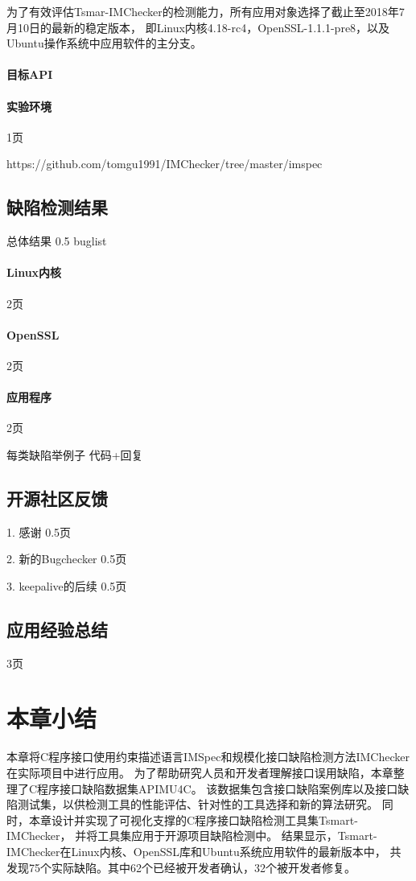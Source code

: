 为了有效评估Tsmar-IMChecker的检测能力，所有应用对象选择了截止至2018年7月10日的最新的稳定版本，
即Linux内核4.18-rc4，OpenSSL-1.1.1-pre8，以及Ubuntu操作系统中应用软件的主分支。

\paragraph{目标API}

\paragraph{实验环境}
1页

https://github.com/tomgu1991/IMChecker/tree/master/imspec


\subsection{缺陷检测结果}



总体结果
0.5
buglist

\paragraph{Linux内核}
2页

\paragraph{OpenSSL}
2页

\paragraph{应用程序}
2页

每类缺陷举例子
代码+回复


\subsection{开源社区反馈}
1. 感谢
0.5页

2. 新的Bugchecker
0.5页

3. keepalive的后续
0.5页

\subsection{应用经验总结}

3页

\section{本章小结}
\label{sec:4.5}
本章将C程序接口使用约束描述语言IMSpec和规模化接口缺陷检测方法IMChecker在实际项目中进行应用。
为了帮助研究人员和开发者理解接口误用缺陷，本章整理了C程序接口缺陷数据集APIMU4C。
该数据集包含接口缺陷案例库以及接口缺陷测试集，以供检测工具的性能评估、针对性的工具选择和新的算法研究。
同时，本章设计并实现了可视化支撑的C程序接口缺陷检测工具集Tsmart-IMChecker，
并将工具集应用于开源项目缺陷检测中。
结果显示，Tsmart-IMChecker在Linux内核、OpenSSL库和Ubuntu系统应用软件的最新版本中，
共发现75个实际缺陷。其中62个已经被开发者确认，32个被开发者修复。